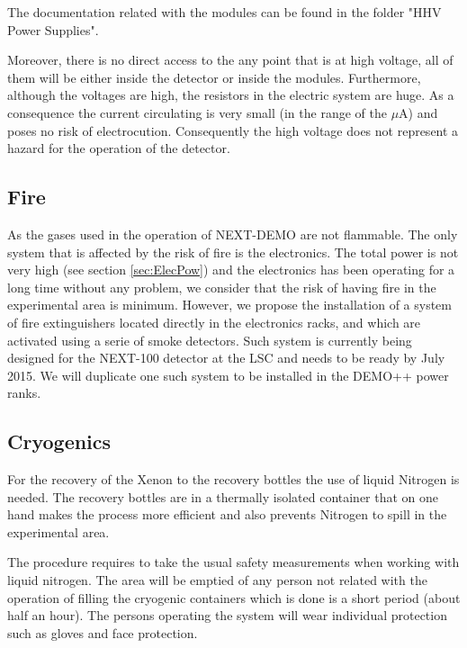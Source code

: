 The documentation related with the modules can be found in the folder "HHV Power Supplies".

Moreover, there is no direct access to the any point that is at high voltage, all of them will be either inside the detector or inside the modules. Furthermore, although the voltages are high, the resistors in the electric system are huge. As a consequence the current circulating is very small (in the range of the $\mu$A) and poses no risk of electrocution. Consequently the high voltage  does not represent a hazard for the operation of the detector.


\subsection{Fire}

As the gases used in the operation of NEXT-DEMO are not flammable. The only system that is affected by the risk of fire is the electronics. The total power is not very high (see section \ref{sec:ElecPow}) and the electronics has been operating for a long time without any problem, we consider that the risk of having fire in the experimental area is minimum. However, we propose the installation of a system of fire extinguishers located directly in the electronics racks, and which are activated using a serie of smoke detectors. Such system is currently being designed for the NEXT-100 detector at the LSC and needs to be ready by July 2015. We will duplicate one such system to be installed in the DEMO++ power ranks. 

\subsection{Cryogenics}

For the recovery of the Xenon to the recovery bottles the use of liquid Nitrogen is needed. The recovery bottles are in a thermally isolated container that on one hand makes the process more efficient and also prevents Nitrogen to spill in the experimental area.

The procedure requires to take the usual safety measurements when working with liquid nitrogen. The area will be emptied of any person not related with the operation of filling the cryogenic containers which is done is a short period (about half an hour). The persons operating the system will wear individual protection such as gloves and face protection.  



